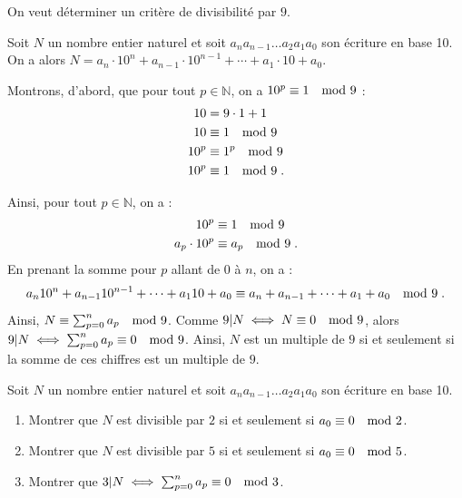       \begin{ex}
            On veut d\'eterminer un crit\`ere de divisibilit\'e par $9$.
            
            Soit $N$ un nombre entier naturel et soit $a_n a_{n-1} \ldots a_2 a_1 a_0$ son \'ecriture en base 10.
            On a alors $N = a_n \cdot 10^n + a_{n-1} \cdot 10^{n-1} + \cdots + a_1 \cdot 10 + a_0$.
            
            Montrons, d'abord, que pour tout $p\in\mathbb{N}$, on a $10^p \equiv 1 \quad \mathrm{mod}\ 9$ :
                  \begin{align*}
                        10 & = 9 \cdot 1 + 1     \\
                        10 &  \equiv 1 \quad \mathrm{mod}\ 9     \\
                        10^p &  \equiv 1^p \quad \mathrm{mod}\ 9 \\
                        10^p &  \equiv 1 \quad \mathrm{mod}\ 9   \;.
                  \end{align*}
                  
            Ainsi, pour tout $p\in\mathbb{N}$, on a :
                  \begin{align*}
                        10^p &  \equiv 1 \quad \mathrm{mod}\ 9                   \\
                        a_p \cdot 10^p &  \equiv a_p \quad \mathrm{mod}\ 9       \;.
                  \end{align*}
            En prenant la somme pour $p$ allant de $0$ \`a $n$, on a :
                  \begin{align*}
                        a_n10^n+a_{n-1}10^{n-1}+\cdots+a_110+a_0 \equiv a_n+a_{n-1}+\cdots+a_1+a_0 \quad \mathrm{mod}\ 9      \;.
                  \end{align*}
            Ainsi, $N \equiv \sum_{p=0}^n a_p \quad \mathrm{mod}\ 9$.
            Comme $9|N \iff N \equiv 0 \quad \mathrm{mod}\ 9$, alors $9|N \iff \sum_{p=0}^n a_p \equiv 0 \quad \mathrm{mod}\ 9$.
            Ainsi, $N$ est un multiple de $9$ si et seulement si la somme de ces chiffres est un multiple de $9$.
      \end{ex}
      \begin{exe}\label{exe:arith-4}
            Soit $N$ un nombre entier naturel et soit $a_n a_{n-1} \ldots a_2 a_1 a_0$ son \'ecriture en base 10.
            \begin{enumerate}
                  \item Montrer que $N$ est divisible par $2$ si et seulement si $a_0 \equiv 0 \quad \mathrm{mod}\ 2$.
                  \item Montrer que $N$ est divisible par $5$ si et seulement si $a_0 \equiv 0 \quad \mathrm{mod}\ 5$.
                  \item Montrer que $3|N \iff \sum_{p=0}^n a_p \equiv 0 \quad \mathrm{mod}\ 3$.
            \end{enumerate}
      \end{exe}
